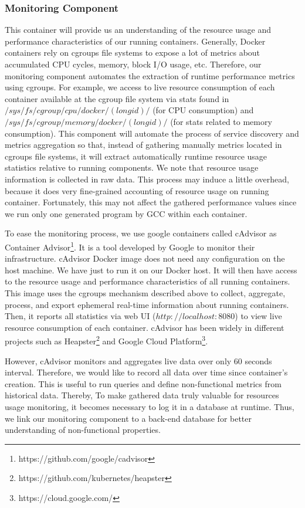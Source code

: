 \subsubsection{Monitoring Component}
This container will provide us an understanding of the resource usage and performance characteristics of our running containers. Generally, Docker containers rely on cgroups file systems to expose a lot of metrics about accumulated CPU cycles, memory, block I/O usage, etc. Therefore, our monitoring component automates the extraction of runtime performance metrics using cgroups. For example, we access to live resource consumption of each container available at the cgroup file system via stats found in $/sys/fs/cgroup/cpu/docker/(longid)/$ (for CPU consumption) and $/sys/fs/cgroup/memory/docker/(longid)/$ (for stats related to memory consumption). This component will automate the process of service discovery and metrics aggregation so that, instead of gathering manually metrics located in cgroups file systems, it will extract automatically runtime resource usage statistics relative to running components. We note that resource usage information is collected in raw data. This process may induce a little overhead, because it does very fine-grained accounting of resource usage on running container. Fortunately, this may not affect the gathered performance values since we run only one generated program by GCC within each container.

To ease the monitoring process, we use google containers called cAdvisor as Container Advisor\footnote{https://github.com/google/cadvisor}. It is a tool developed by Google to monitor their infrastructure. 
cAdvisor Docker image does not need any configuration on the host machine. We have just to run it on our Docker host. It will then have access to the resource usage and performance characteristics of all running containers. This image uses the cgroups mechanism described above to collect, aggregate, process, and export ephemeral real-time information about running containers. Then, it reports all statistics via web UI ($http://localhost:8080$) to view live resource consumption of each container. cAdvisor has been widely in different projects such as Heapster\footnote{https://github.com/kubernetes/heapster} and Google Cloud Platform\footnote{https://cloud.google.com/}.

However, cAdvisor monitors and aggregates live data over only 60 seconds interval. Therefore, we would like to record all data over time since container's creation. This is useful to run queries and define non-functional metrics from historical data. Thereby, To make gathered data truly valuable for resources usage monitoring, it becomes necessary to log it in a database at runtime. Thus, we link our monitoring component to a back-end database for better understanding of non-functional properties. 
